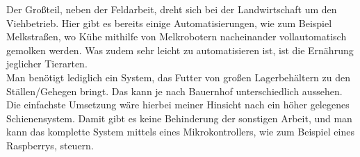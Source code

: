 Der Großteil, neben der Feldarbeit, dreht sich bei der Landwirtschaft um den Viehbetrieb. Hier gibt es bereits einige Automatisierungen, wie zum Beispiel Melkstraßen, wo Kühe mithilfe von Melkrobotern nacheinander vollautomatisch gemolken werden. Was zudem sehr leicht zu automatisieren ist, ist die Ernährung jeglicher Tierarten.\\
Man benötigt lediglich ein System, das Futter von großen Lagerbehältern zu den Ställen/Gehegen bringt. Das kann je nach Bauernhof unterschiedlich aussehen. Die einfachste Umsetzung wäre hierbei meiner Hinsicht nach ein höher gelegenes Schienensystem. Damit gibt es keine Behinderung der sonstigen Arbeit, und man kann das komplette System mittels eines Mikrokontrollers, wie zum Beispiel eines Raspberrys, steuern.